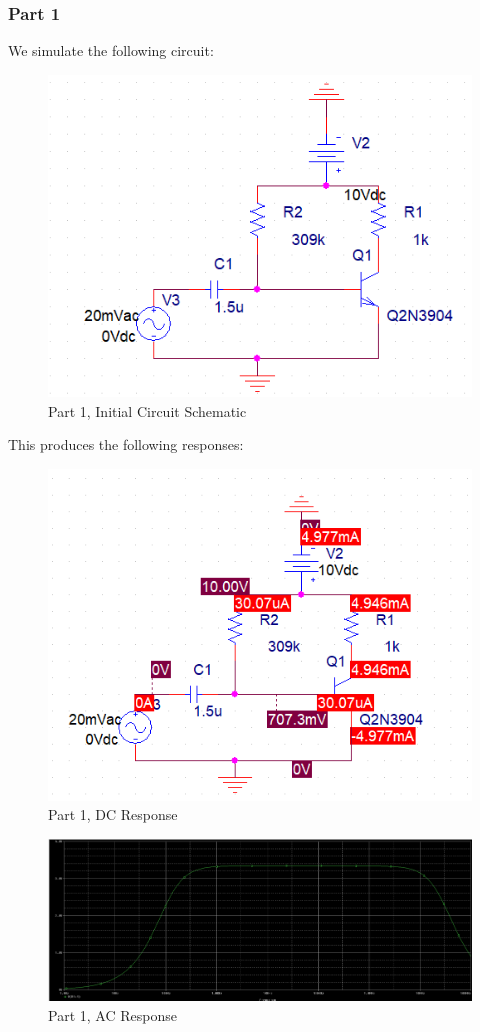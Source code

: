 \documentclass[
	letterpaper, %
	10pt, %
]{CSUniSchoolLabReport}
\begin{document}
\subsubsection{Part 1}

We simulate the following circuit:

\begin{figure}[H]
  \centering
  \includegraphics[width=.8\textwidth]{Figures/L4F6}
  \caption{Part 1, Initial Circuit Schematic}
  \label{fig:8}
\end{figure}

This produces the following responses:

\begin{figure}[H]
  \centering
  \includegraphics[width=.8\textwidth]{Figures/L4F7}
  \caption{Part 1, DC Response}
  \label{fig:9}
\end{figure}

\begin{figure}[H]
  \centering
  \includegraphics[width=.8\textwidth]{Figures/L4F8}
  \caption{Part 1, AC Response}
  \label{fig:10}
\end{figure}
\end{document}
